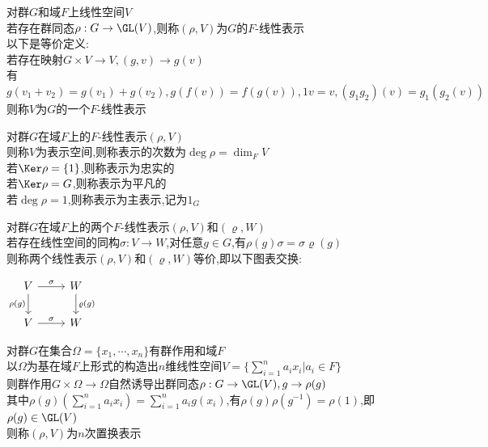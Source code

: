 

%

\setcounter{section}{0}
\setcounter{subsection}{0}

\begin{dingyi}
对群$G$和域$F$上线性空间$V$\\
若存在群同态$\rho:G\to\GL(V)$,则称$(\rho,V)$为$G$的$F$-线性表示\\
以下是等价定义:\\
若存在映射$G\times V\to V,(g,v)\to g(v)$\\
有$g(v_1+v_2)=g(v_1)+g(v_2),g(f(v))=f(g(v)),1v=v,(g_1g_2)(v)=g_1(g_2(v))$\\
则称$V$为$G$的一个$F$-线性表示
\end{dingyi}

\begin{dingyi}
对群$G$在域$F$上的$F$-线性表示$(\rho,V)$\\
则称$V$为表示空间,则称表示的次数为$\deg \rho=\dim_{F}V$\\
若$\Ker \rho=\{1\}$,则称表示为忠实的\\
若$\Ker \rho=G$,则称表示为平凡的\\
若$\deg \rho=1$,则称表示为主表示,记为$1_{G}$
\end{dingyi}

\begin{dingyi}
对群$G$在域$F$上的两个$F$-线性表示$(\rho,V)$和$(\varrho,W)$\\
若存在线性空间的同构$\sigma:V\to W$,对任意$g\in G$,有$\rho(g)\sigma=\sigma\varrho(g)$\\
则称两个线性表示$(\rho,V)$和$(\varrho,W)$等价,即以下图表交换:
\begin{center}
    $\begin{tikzcd}[column sep=normal,row sep=normal]
    V \ar[r,"\sigma"] \ar[d,"\rho(g)"'] & W \ar[d,"\varrho(g)"] \\
    V \ar[r,"\sigma"] & W 
    \end{tikzcd}$
\end{center}
\end{dingyi}

\begin{dingyi}
对群$G$在集合$\Omega=\{x_1,\cdots,x_n\}$有群作用和域$F$\\
以$\Omega$为基在域$F$上形式的构造出$n$维线性空间$V=\{\sum\limits_{i=1}^{n}a_ix_i|a_i\in F\}$\\
则群作用$G\times\Omega\to\Omega$自然诱导出群同态$\rho:G\to \GL(V),g\to \rho(g)$\\
其中$\rho(g)(\sum\limits_{i=1}^{n}a_ix_i)=\sum\limits_{i=1}^{n}a_ig(x_i)$,有$\rho(g)\rho(g^{-1})=\rho(1)$,即$\rho(g)\in \GL(V)$\\
则称$(\rho,V)$为$n$次置换表示
\end{dingyi}

